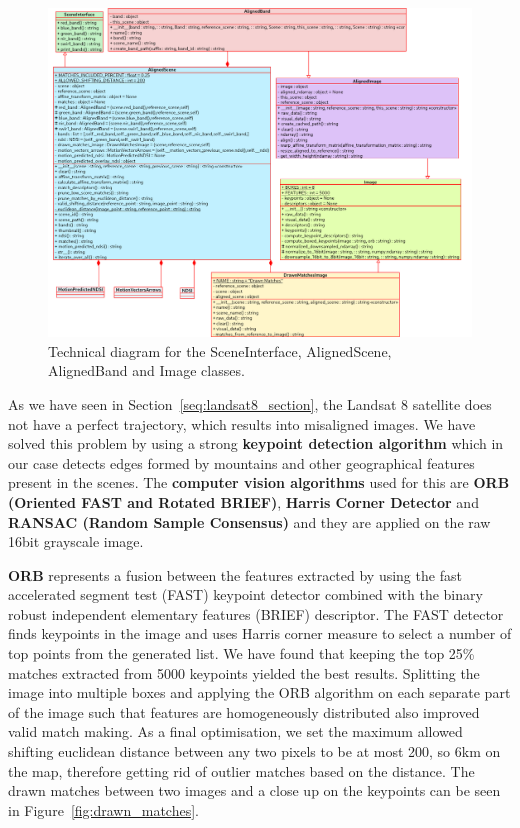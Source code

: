 \documentclass[12pt, a4paper]{report}
\begin{document}
	\begin{figure}[h!]
		\centering
		\includegraphics[width=\columnwidth]{../images/alignment_diagram.png}
		\caption{Technical diagram for the SceneInterface, AlignedScene, AlignedBand and Image classes.}
		\label{fig:alignment_diagram}
	\end{figure}
	
	\par As we have seen in Section~\ref{seq:landsat8_section}, the Landsat 8 satellite does not have a perfect trajectory, which results into misaligned images. We have solved this problem by using a strong \textbf{keypoint detection algorithm} which in our case detects edges formed by mountains and other geographical features present in the scenes. The \textbf{computer vision algorithms} used for this are \textbf{ORB (Oriented FAST and Rotated BRIEF)}, \textbf{Harris Corner Detector} and \textbf{RANSAC (Random Sample Consensus)} and they are applied on the raw 16bit grayscale image.
	
	\par \textbf{ORB} represents a fusion between the features extracted by using the fast accelerated
	segment test (FAST) keypoint detector combined with the binary robust independent
	elementary features (BRIEF) descriptor. The FAST detector finds keypoints in the
	image and uses Harris corner measure to select a number of top points from the
	generated list. We have found that keeping the top 25\% matches extracted from 5000 keypoints yielded the best results. Splitting
	the image into multiple boxes and applying the ORB algorithm on each separate
	part of the image such that features are homogeneously distributed also improved valid match making. As a final optimisation, we set the maximum allowed shifting euclidean distance between any two
	pixels to be at most 200, so 6km on the map, therefore getting rid of outlier matches
	based on the distance. The drawn matches between two images and a close up on the keypoints can be seen in Figure~\ref{fig:drawn_matches}.
	
\end{document}
